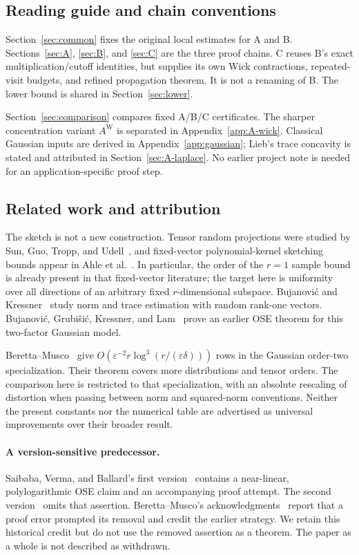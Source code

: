 \documentclass[11pt]{article}
\numberwithin{equation}{section}
\theoremstyle{definition}\newtheorem{definition}[theorem]{Definition}
\theoremstyle{remark}\newtheorem{remark}[theorem]{Remark}
\begin{document}
\subsection{Reading guide and chain conventions}
Section~\ref{sec:common} fixes the original local estimates for A and B.
Sections~\ref{sec:A}, \ref{sec:B}, and \ref{sec:C} are the three proof chains.
C reuses B's exact multiplication/cutoff identities, but supplies its own Wick
contractions, repeated-visit budgets, and refined propagation theorem. It is
not a renaming of B. The lower bound is shared in Section~\ref{sec:lower}.

Section~\ref{sec:comparison} compares fixed A/B/C certificates. The sharper
concentration variant $A^{\mathrm W}$ is separated in Appendix~\ref{app:A-wick}.
Classical Gaussian inputs are derived in Appendix~\ref{app:gaussian}; Lieb's
trace concavity is stated and attributed in Section~\ref{sec:A-laplace}.
No earlier project note is needed for an application-specific proof step.

\clearpage
\subsection{Related work and attribution}\label{sec:attribution-intro}
The sketch is not a new construction. Tensor random projections were studied by
Sun, Guo, Tropp, and Udell~\cite{Sun}, and fixed-vector polynomial-kernel sketching
bounds appear in Ahle et al.~\cite[Appendix~A.2, Theorem~42]{Ahle}.
In particular, the order of the $r=1$ sample bound is already present in that
fixed-vector literature; the target
here is uniformity over all directions of an arbitrary fixed $r$-dimensional
subspace. Bujanovi\'c and Kressner~\cite{BK} study norm and trace estimation with
random rank-one vectors. Bujanovi\'c, Grubi\v{s}i\'c, Kressner, and
Lam~\cite{BGKL} prove an earlier OSE theorem for this two-factor Gaussian model.

Beretta--Musco~\cite[Theorem~1.3]{BM} give
$O(\varepsilon^{-2}r\log^3(r/(\varepsilon\delta)))$ rows in the Gaussian
order-two specialization. Their theorem covers more distributions and tensor
orders. The comparison here is restricted to that specialization, with an
absolute rescaling of distortion when passing between norm and squared-norm
conventions. Neither the present constants nor the numerical table are advertised
as universal improvements over their broader result.

\paragraph{A version-sensitive predecessor.}
Saibaba, Verma, and Ballard's first version~\cite[Theorem~11]{SVBv1}
contains a near-linear, polylogarithmic OSE claim and an accompanying proof
attempt. The second version~\cite{SVBv2} omits that assertion. Beretta--Musco's
acknowledgments~\cite{BM} report that a proof error prompted its removal and
credit the earlier strategy. We retain this historical credit but do not use the
removed assertion as a theorem. The paper as a whole is not described as withdrawn.
\end{document}
